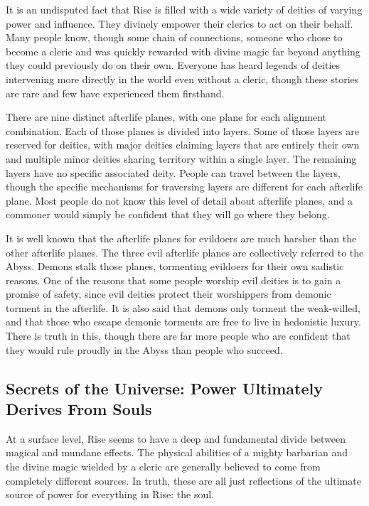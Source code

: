         It is an undisputed fact that Rise is filled with a wide variety of deities of varying power and influence.
        They divinely empower their clerics to act on their behalf.
        Many people know, though some chain of connections, someone who chose to become a cleric and was quickly rewarded with divine magic far beyond anything they could previously do on their own.
        Everyone has heard legends of deities intervening more directly in the world even without a cleric, though these stories are rare and few have experienced them firsthand.

        There are nine distinct afterlife planes, with one plane for each alignment combination.
        Each of those planes is divided into layers.
        Some of those layers are reserved for deities, with major deities claiming layers that are entirely their own and multiple minor deities sharing territory within a single layer.
        The remaining layers have no specific associated deity.
        People can travel between the layers, though the specific mechanisms for traversing layers are different for each afterlife plane.
        Most people do not know this level of detail about afterlife planes, and a commoner would simply be confident that they will go where they belong.

        It is well known that the afterlife planes for evildoers are much harsher than the other afterlife planes.
        The three evil afterlife planes are collectively referred to the Abyss.
        Demons stalk those planes, tormenting evildoers for their own sadistic reasons.
        One of the reasons that some people worship evil deities is to gain a promise of safety, since evil deities protect their worshippers from demonic torment in the afterlife.
        It is also said that demons only torment the weak-willed, and that those who escape demonic torments are free to live in hedonistic luxury.
        There is truth in this, though there are far more people who are confident that they would rule proudly in the Abyss than people who succeed.

    \subsection{Secrets of the Universe: Power Ultimately Derives From Souls}
        At a surface level, Rise seems to have a deep and fundamental divide between magical and mundane effects.
        The physical abilities of a mighty barbarian and the divine magic wielded by a cleric are generally believed to come from completely different sources.
        In truth, these are all just reflections of the ultimate source of power for everything in Rise: the soul.

